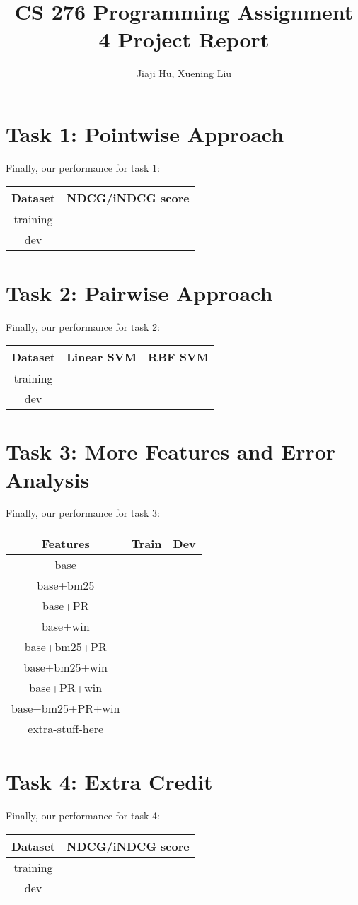 \documentclass[10pt,twocolumn]{article}
\begin{document}
\title{CS 276 Programming Assignment 4 Project Report}
\author{Jiaji Hu, Xuening Liu}
\date{}
\maketitle

\section*{Task 1: Pointwise Approach}
Finally, our performance for task 1:
\begin{table}[H]
\centering
\begin{tabular}{|c|c|}
\hline
Dataset & NDCG/iNDCG score \\\hline
training & \\\hline
dev & \\\hline
\end{tabular}
\end{table}

\section*{Task 2: Pairwise Approach}
Finally, our performance for task 2:
\begin{table}[H]
\centering
\begin{tabular}{|c|c|c|}
\hline
Dataset & Linear SVM & RBF SVM \\\hline
training & & \\\hline
dev & & \\\hline
\end{tabular}
\end{table}

\section*{Task 3: More Features and Error Analysis}
Finally, our performance for task 3:
\begin{table}[H]
\centering
\begin{tabular}{|c|c|c|}
\hline
Features &Train& Dev \\\hline
base & & \\\hline
base+bm25 & & \\\hline
base+PR & & \\\hline
base+win & & \\\hline
base+bm25+PR & & \\\hline
base+bm25+win & & \\\hline
base+PR+win & & \\\hline
base+bm25+PR+win & & \\\hline
extra-stuff-here & & \\\hline
\end{tabular}
\end{table}

\section*{Task 4: Extra Credit}
Finally, our performance for task 4:
\begin{table}[H]
\centering
\begin{tabular}{|c|c|}
\hline
Dataset & NDCG/iNDCG score \\\hline
training & \\\hline
dev & \\\hline
\end{tabular}
\end{table}
\end{document}
